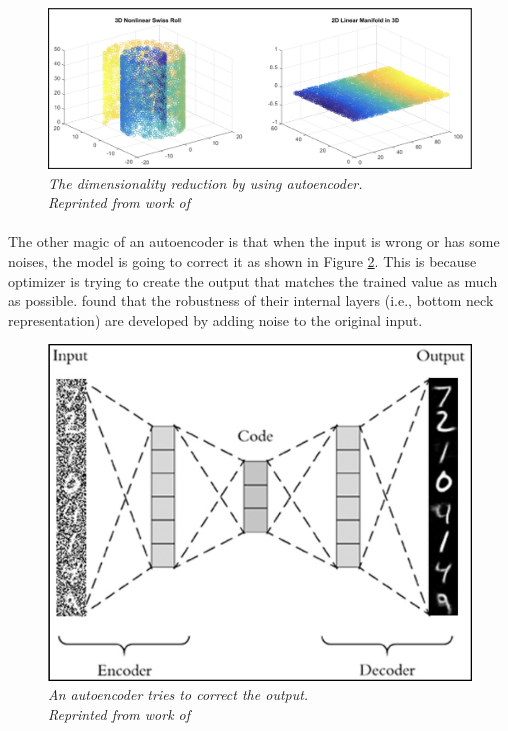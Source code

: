 \begin{figure}[H]
  \centering
  \caption[The dimensionality reduction by using autoencoder.]{\emph{The dimensionality reduction by using autoencoder. \\ 
  Reprinted from work of \citeauthor{the_swiss_roll_2015} \citeyear{the_swiss_roll_2015}}}\label{fig:ae_f_reduction}
  \includegraphics[scale = 0.2]{figures/ae_f_reduction.jpg}  
\end{figure}


\paragraph{}
The other magic of an autoencoder is that when the input is wrong or has some noises, the model is going to correct it as shown in Figure \ref{fig:ae_2}. This is because optimizer is trying to create the output that matches the trained value as much as possible. \citeauthor{vincent_larochelle_bengio_manzagol_2008} \citeyear{vincent_larochelle_bengio_manzagol_2008} found that the robustness of their internal layers (i.e., bottom neck representation) are developed by adding noise to the original input.


\begin{figure}[H]
  \centering
  \caption[An autoencoder tries to correct the output.]{\emph{An autoencoder tries to correct the output. \\
  Reprinted from work of \citeauthor{rosebrock_2020} \citeyear{rosebrock_2020}}}\label{fig:ae_2}
  \includegraphics[scale = 0.4]{figures/ae_2.jpg}  
\end{figure}

